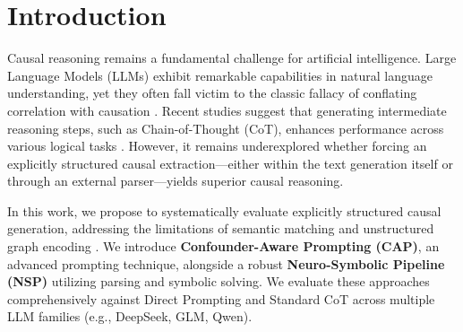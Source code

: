\documentclass{article}
\theoremstyle{plain}
\theoremstyle{definition}
\theoremstyle{remark}
\begin{document}
\begin{abstract}
Large Language Models (LLMs) often struggle to distinguish genuine causal relationships from mere correlations \cite{kiciman2024causal, mdpi2026illusion, jin2024corr2cause}. In this paper, we evaluate whether guiding LLMs to explicitly construct structured causal expressions improves their causal reasoning capabilities. We investigate this through two distinct paradigms: (1) Confounder-Aware Prompting (CAP), a pure-prompting pipeline that forces LLMs to explicitly articulate causal pathways and confounders in natural language, and (2) a Neuro-Symbolic Pipeline (NSP) that uses LLMs to parse queries into structured causal graphs, verifies them, and applies a deterministic symbolic solver. Evaluating across a suite of LLMs (e.g., DeepSeek, GLM, Qwen) on the CLadder benchmark, we find that while structural prompting (CAP) matches standard Chain-of-Thought (CoT) in accuracy and improves interpretability, standard heuristics in strong models often saturate zero-shot accuracy. Meanwhile, the neuro-symbolic approach (NSP) offers strict verification of rule-based causal inference for successfully parsed queries. Our findings reveal the trade-offs between internalized reasoning heuristics and explicit symbolic logic in modern LLMs.
\end{abstract}

\section{Introduction}

Causal reasoning remains a fundamental challenge for artificial intelligence. Large Language Models (LLMs) exhibit remarkable capabilities in natural language understanding, yet they often fall victim to the classic fallacy of conflating correlation with causation \cite{mdpi2026illusion}. Recent studies suggest that generating intermediate reasoning steps, such as Chain-of-Thought (CoT), enhances performance across various logical tasks \cite{structuredcot, causalflip2025, ma2025survey}. However, it remains underexplored whether forcing an explicitly structured causal extraction---either within the text generation itself or through an external parser---yields superior causal reasoning.

In this work, we propose to systematically evaluate explicitly structured causal generation, addressing the limitations of semantic matching \cite{causalflip2025} and unstructured graph encoding \cite{sheth2025causalgraph}. We introduce \textbf{Confounder-Aware Prompting (CAP)}, an advanced prompting technique, alongside a robust \textbf{Neuro-Symbolic Pipeline (NSP)} utilizing parsing and symbolic solving. We evaluate these approaches comprehensively against Direct Prompting and Standard CoT across multiple LLM families (e.g., DeepSeek, GLM, Qwen).
\end{document}
